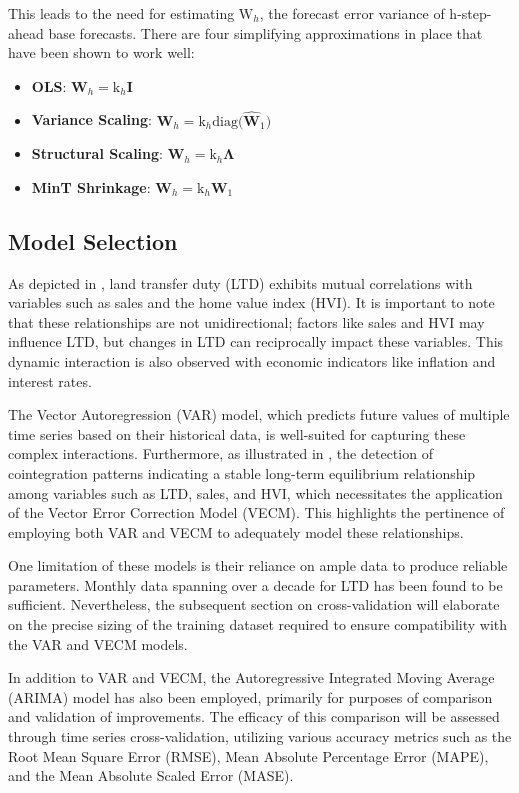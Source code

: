 \documentclass[11pt,a4paper,]{article}
\begin{document}
This leads to the need for estimating \(\text{W}_{h}\), the forecast error variance of h-step-ahead base forecasts. There are four simplifying approximations in place that have been shown to work well:

\begin{itemize}
\item
  \textbf{OLS}: \(\mathbf{W}_{h} = \text{k}_{h}\mathbf{I}\)
\item
  \textbf{Variance Scaling}: \(\mathbf{W}_{h} = \text{k}_{h}\text{diag(}\mathbf{\hat{W}}_{1}\text{)}\)
\item
  \textbf{Structural Scaling}: \(\mathbf{W}_{h} = \text{k}_{h}\mathbf{\Lambda}\)
\item
  \textbf{MinT Shrinkage}: \(\mathbf{W}_{h} = \text{k}_{h}\mathbf{W}_{1}\)
\end{itemize}

\subsection{Model Selection}\label{model-selection}

As depicted in \emph{}, land transfer duty (LTD) exhibits mutual correlations with variables such as sales and the home value index (HVI). It is important to note that these relationships are not unidirectional; factors like sales and HVI may influence LTD, but changes in LTD can reciprocally impact these variables. This dynamic interaction is also observed with economic indicators like inflation and interest rates.

The Vector Autoregression (VAR) model, which predicts future values of multiple time series based on their historical data, is well-suited for capturing these complex interactions. Furthermore, as illustrated in \emph{}, the detection of cointegration patterns indicating a stable long-term equilibrium relationship among variables such as LTD, sales, and HVI, which necessitates the application of the Vector Error Correction Model (VECM). This highlights the pertinence of employing both VAR and VECM to adequately model these relationships.

One limitation of these models is their reliance on ample data to produce reliable parameters. Monthly data spanning over a decade for LTD has been found to be sufficient. Nevertheless, the subsequent section on cross-validation will elaborate on the precise sizing of the training dataset required to ensure compatibility with the VAR and VECM models.

In addition to VAR and VECM, the Autoregressive Integrated Moving Average (ARIMA) model has also been employed, primarily for purposes of comparison and validation of improvements. The efficacy of this comparison will be assessed through time series cross-validation, utilizing various accuracy metrics such as the Root Mean Square Error (RMSE), Mean Absolute Percentage Error (MAPE), and the Mean Absolute Scaled Error (MASE).
\end{document}
